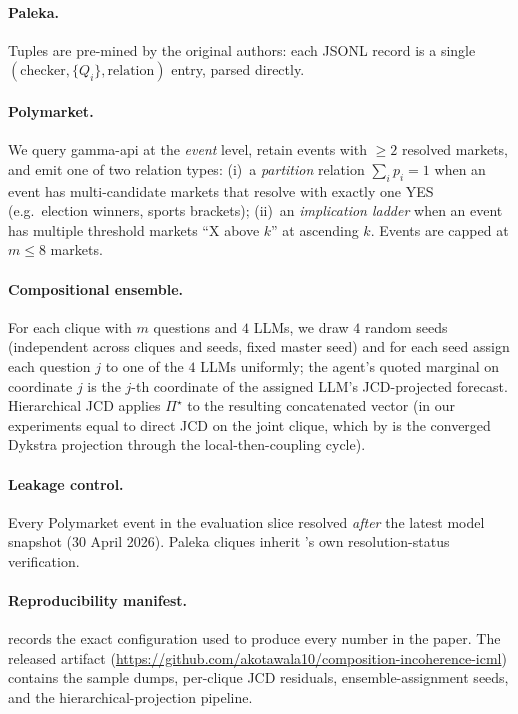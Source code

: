 \documentclass{article}
\theoremstyle{plain}
\theoremstyle{definition}
\theoremstyle{remark}
\newcommand{\Pijoint}{\Pi^{\star}}
\begin{document}
\paragraph{Paleka.} Tuples are pre-mined by the original authors:
each JSONL record is a single $(\mathrm{checker}, \{Q_i\},
\mathrm{relation})$ entry, parsed directly.

\paragraph{Polymarket.} We query gamma-api at the \emph{event}
level, retain events with $\ge\!2$ resolved markets, and emit one
of two relation types: (i)~a \emph{partition} relation
$\sum_i p_i = 1$ when an event has multi-candidate markets that
resolve with exactly one YES (e.g.\ election winners, sports
brackets); (ii)~an \emph{implication ladder} when an event has
multiple threshold markets ``X above $k$'' at ascending $k$.
Events are capped at $m{\le}8$ markets.

\paragraph{Compositional ensemble.}
For each clique with $m$ questions and $4$ LLMs, we draw $4$ random
seeds (independent across cliques and seeds, fixed master seed) and
for each seed assign each question $j$ to one of the $4$ LLMs
uniformly; the agent's quoted marginal on coordinate $j$ is the
$j$-th coordinate of the assigned LLM's JCD-projected forecast.
Hierarchical JCD applies $\Pijoint$ to the resulting concatenated
vector (in our experiments equal to direct JCD on the joint clique,
which by  is the converged Dykstra projection
through the local-then-coupling cycle).

\paragraph{Leakage control.} Every Polymarket event in the
evaluation slice resolved \emph{after} the latest model snapshot
(30 April 2026). Paleka cliques inherit
\citet{paleka2024consistency}'s own resolution-status verification.

\paragraph{Reproducibility manifest.}
 records the exact configuration used to produce
every number in the paper. The released artifact
(\url{https://github.com/akotawala10/composition-incoherence-icml})
contains the sample dumps, per-clique JCD residuals,
ensemble-assignment seeds, and the hierarchical-projection
pipeline.
\end{document}
